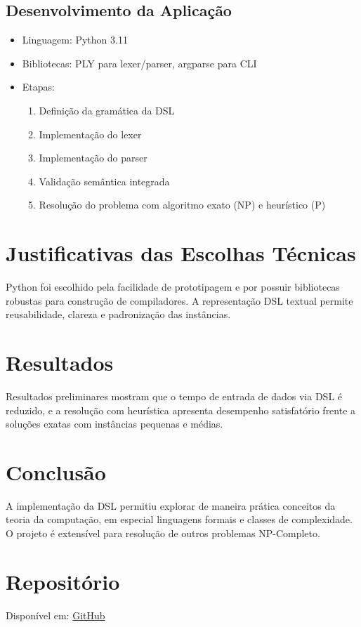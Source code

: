 \documentclass[conference]{IEEEtran}
\begin{document}
\subsection{Desenvolvimento da Aplicação}
\begin{itemize}
    \item Linguagem: Python 3.11
    \item Bibliotecas: PLY para lexer/parser, argparse para CLI
    \item Etapas:
    \begin{enumerate}
        \item Definição da gramática da DSL
        \item Implementação do lexer
        \item Implementação do parser
        \item Validação semântica integrada
        \item Resolução do problema com algoritmo exato (NP) e heurístico (P)
    \end{enumerate}
\end{itemize}

\section{Justificativas das Escolhas Técnicas}
Python foi escolhido pela facilidade de prototipagem e por possuir bibliotecas robustas para construção de compiladores. A representação DSL textual permite reusabilidade, clareza e padronização das instâncias.

\section{Resultados}
Resultados preliminares mostram que o tempo de entrada de dados via DSL é reduzido, e a resolução com heurística apresenta desempenho satisfatório frente a soluções exatas com instâncias pequenas e médias.

\section{Conclusão}
A implementação da DSL permitiu explorar de maneira prática conceitos da teoria da computação, em especial linguagens formais e classes de complexidade. O projeto é extensível para resolução de outros problemas NP-Completo.

\section*{Repositório}
Disponível em: \href{https://github.com/Guilherme-del/uniararas/tree/master/python/teoriaCompiladores/n2}{GitHub}



\end{document}
